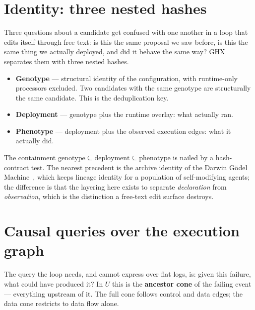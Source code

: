 \section{Identity: three nested hashes}
\label{sec:identity}

Three questions about a candidate get confused with one another in a loop
that edits itself through free text: is this the same proposal we saw
before, is this the same thing we actually deployed, and did it behave the
same way? GHX separates them with three nested hashes.

\begin{itemize}
  \item \textbf{Genotype} --- structural identity of the configuration,
        with runtime-only processors excluded. Two candidates with the same
        genotype are structurally the same candidate. This is the
        deduplication key.
  \item \textbf{Deployment} --- genotype plus the runtime overlay: what
        actually ran.
  \item \textbf{Phenotype} --- deployment plus the observed execution
        edges: what it actually did.
\end{itemize}

The containment $\text{genotype} \subseteq \text{deployment} \subseteq
\text{phenotype}$ is nailed by a hash-contract test. The nearest precedent
is the archive identity of the Darwin G\"odel Machine~\cite{dgm}, which keeps
lineage identity for a population of self-modifying agents; the difference
is that the layering here exists to separate \emph{declaration} from
\emph{observation}, which is the distinction a free-text edit surface
destroys.

\section{Causal queries over the execution graph}
\label{sec:cones}

The query the loop needs, and cannot express over flat logs, is: given this
failure, what could have produced it? In $U$ this is the \textbf{ancestor
cone} of the failing event --- everything upstream of it. The full cone
follows control and data edges; the data cone restricts to data flow alone.

